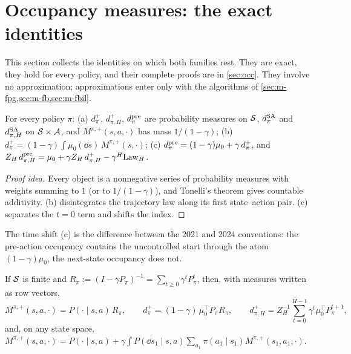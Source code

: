 \section{Occupancy measures: the exact identities}\label{sec:occupancy}

This section collects the identities on which both families rest. They are exact, they hold for every policy, and their complete proofs are in \cref{sec:occ}. They involve no approximation; approximations enter only with the algorithms of \cref{sec:m-fpg,sec:m-fb,sec:m-fbil}.

\begin{proposition}\label{prop:m-norm}
For every policy $\pi$:
(a) $d^+_\pi$, $d^+_{\pi,H}$, $d^{\mathrm{pre}}_\pi$ are probability measures on $\mathcal{S}$, $d^{\mathrm{SA}}_\pi$ and $d^{\mathrm{SA}}_{\pi,H}$ on $\mathcal{S}\times\mathcal{A}$, and $M^{\pi,+}(s,a,\cdot)$ has mass $1/(1-\gamma)$;
(b) $d^+_\pi=(1-\gamma)\int\mu_0(\dd s)\,M^{\pi,+}(s,\cdot)$;
(c) $d^{\mathrm{pre}}_\pi=(1-\gamma)\mu_0+\gamma\,d^+_\pi$, and $Z_H\,d^{\mathrm{pre}}_{\pi,H}=\mu_0+\gamma Z_H\,d^+_{\pi,H}-\gamma^H\mathrm{Law}_H$.
\end{proposition}
\begin{proof}[Proof idea]
Every object is a nonnegative series of probability measures with weights summing to $1$ (or to $1/(1-\gamma)$), and Tonelli's theorem gives countable additivity. (b) disintegrates the trajectory law along its first state--action pair. (c) separates the $t=0$ term and shifts the index.
\end{proof}

The time shift (c) is the difference between the 2021 and 2024 conventions: the pre-action occupancy contains the uncontrolled start through the atom $(1-\gamma)\mu_0$, the next-state occupancy does not.

\begin{proposition}\label{prop:m-resolvent}
If $\mathcal{S}$ is finite and $R_\pi:=(I-\gamma P_\pi)^{-1}=\sum_{t\ge0}\gamma^tP_\pi^t$, then, with measures written as row vectors,
\[
M^{\pi,+}(s,a,\cdot)=P(\cdot\mid s,a)\,R_\pi,\qquad d^+_\pi=(1-\gamma)\,\mu_0^\top P_\pi R_\pi,\qquad d^+_{\pi,H}=Z_H^{-1}\sum_{t=0}^{H-1}\gamma^t\mu_0^\top P_\pi^{t+1},
\]
and, on any state space, $M^{\pi,+}(s,a,\cdot)=P(\cdot\mid s,a)+\gamma\int P(\dd s_1\mid s,a)\sum_{a_1}\pi(a_1\mid s_1)M^{\pi,+}(s_1,a_1,\cdot)$.
\end{proposition}

